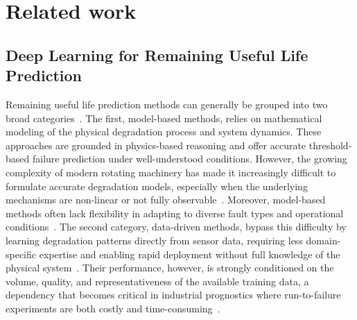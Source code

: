 \section{Related work}
\label{sec:related_work}

\subsection{Deep Learning for Remaining Useful Life Prediction}
\label{sec:dl_rul}

Remaining useful life prediction methods can generally be grouped
into two broad categories~\cite{shang_capsule_2024, bai_towards_2024}.
The first, model-based methods, relies on mathematical modeling of
the physical degradation process and system dynamics. These approaches
are grounded in physics-based reasoning and offer accurate
threshold-based failure prediction under well-understood conditions.
However, the growing complexity of modern rotating machinery has made
it increasingly difficult to formulate accurate degradation models,
especially when the underlying mechanisms are non-linear or not fully
observable~\cite{heimes_recurrent_2008}. Moreover, model-based methods
often lack flexibility in adapting to diverse fault types and
operational conditions~\cite{shang_capsule_2024}. The second category,
data-driven methods, bypass this difficulty by learning
degradation patterns directly from sensor data, requiring less
domain-specific expertise and enabling rapid deployment without full
knowledge of the physical system~\cite{datadriven,
heimes_recurrent_2008}. Their performance, however, is strongly
conditioned on the volume, quality, and representativeness of the
available training data, a dependency that becomes critical in
industrial prognostics where run-to-failure experiments are both costly
and time-consuming~\cite{s25144481, pan2025remaining}.\\

